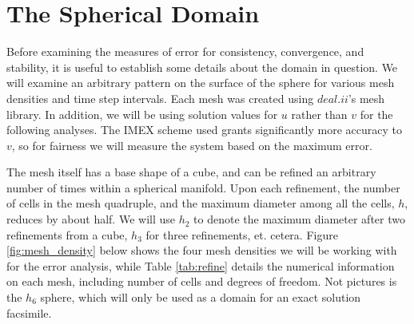 \documentclass[12pt]{article}
\begin{document}
\section{The Spherical Domain}

Before examining the measures of error for consistency, convergence, and stability, it is useful to establish some details about the domain in question. We will examine an arbitrary pattern on the surface of the sphere for various mesh densities and time step intervals. Each mesh was created using $deal.ii$'s mesh library. In addition, we will be using solution values for $u$ rather than $v$ for the following analyses. The IMEX scheme used grants significantly more accuracy to $v$, so for fairness we will measure the system based on the maximum error.

The mesh itself has a base shape of a cube, and can be refined an arbitrary number of times within a spherical manifold. Upon each refinement, the number of cells in the mesh quadruple, and the maximum diameter among all the cells, $h$, reduces by about half. We will use $h_2$ to denote the maximum diameter after two refinements from a cube, $h_3$ for three refinements, et. cetera. Figure \ref{fig:mesh_density} below shows the four mesh densities we will be working with for the error analysis, while Table \ref{tab:refine} details the numerical information on each mesh, including number of cells and degrees of freedom. Not pictures is the $h_6$ sphere, which will only be used as a domain for an exact solution facsimile.
\end{document}
